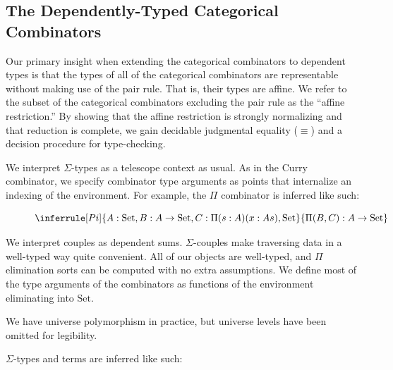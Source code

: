 \documentclass{article}
\newcommand{\set}{\mathrm{Set}}
\begin{document}
\subsection{The Dependently-Typed Categorical Combinators}

Our primary insight when extending the categorical combinators to dependent types is that the types of all of the categorical combinators are representable without making use of the pair rule. That is, their types are affine. We refer to the subset of the categorical combinators excluding the pair rule as the ``affine restriction.'' By showing that the affine restriction is strongly normalizing and that reduction is complete, we gain decidable judgmental equality (\(\equiv\)) and a decision procedure for type-checking.

We interpret \(\Sigma\)-types as a telescope context as usual. As in the Curry combinator, we specify combinator type arguments as points that internalize an indexing of the environment. For example, the \(\Pi\) combinator is inferred like such:

\begin{figure}[h!]
  \centering
  \begin{equation}\label{infer_pi}
    \inferrule [Pi]
    { A : \set, B : A \rightarrow \set, C : \Pi(s : A) (x : A s),\set}
    { \Pi(B, C) : A \rightarrow \set}
  \end{equation}
\end{figure}

We interpret couples as dependent sums. \(\Sigma\)-couples make traversing data in a well-typed way quite convenient. All of our objects are well-typed, and \(\Pi\) elimination sorts can be computed with no extra assumptions. We define most of the type arguments of the combinators as functions of the environment eliminating into \(\set\).

We have universe polymorphism in practice, but universe levels have been omitted for legibility.

\(\Sigma\)-types and terms are inferred like such:

\begin{figure}
  \begin{tabular}
    
  \end{tabular}
\end{figure}




\end{document}
